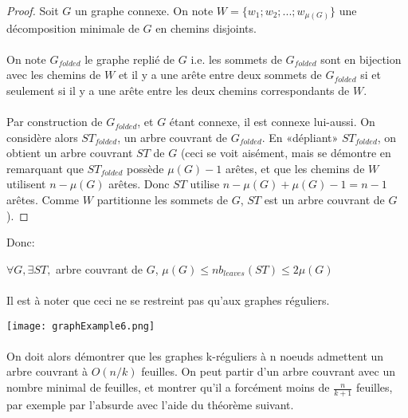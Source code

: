 \documentclass[a4paper]{article}
\theoremstyle{definition}
\theoremstyle{remark}
\begin{document}
\begin{proof}
Soit $G$ un graphe connexe. On note $W= \{ w_{1};w_{2};...;w_{\mu(G)} \}$ une décomposition minimale de $G$ en chemins disjoints.

\paragraph{}
On note $G_{folded}$ le graphe replié de $G$ i.e. les sommets de $G_{folded}$ sont en bijection avec les chemins de $W$ et il y a une arête entre deux sommets de $G_{folded}$ si et seulement si il y a une arête
entre les deux chemins correspondants de $W$.

\paragraph{}
Par construction de $G_{folded}$, et $G$ étant connexe, il est connexe 
lui-aussi. On considère alors $ST_{folded}$, un arbre couvrant de $G_{folded}$. En «dépliant» $ST_{folded}$, on obtient un arbre couvrant $ST$ de $G$ (ceci se voit aisément, mais se démontre en remarquant que $ST_{folded}$ possède $\mu(G)-1$ arêtes, et que les chemins de $W$ utilisent $n - \mu(G)$ arêtes. Donc $ST$ utilise $n - \mu(G) + \mu(G)-1 = n-1$ arêtes. Comme $W$ partitionne les sommets de $G$, $ST$ est un arbre couvrant de $G$).
\end{proof}

Donc:

$\forall G, \exists ST,$ arbre couvrant de $G$, $ \mu(G) \leq nb_{leaves}(ST) \leq 2\mu(G)$

\paragraph{}
Il est à noter que ceci ne se restreint pas qu'aux graphes réguliers.

\texttt{[image: graphExample6.png]}

\paragraph{}
On doit alors démontrer que les graphes k-réguliers à n noeuds admettent
un arbre couvrant à $O(n/k)$ feuilles. On peut partir d'un arbre
couvrant avec un nombre minimal de feuilles, et montrer qu'il a forcément moins de $\frac{n}{k+1}$ feuilles, par exemple par l'absurde 
avec l'aide du théorème suivant.
\end{document}
